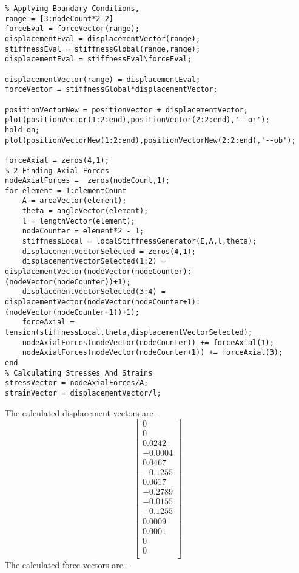 \documentclass{article}
\begin{document}
\begin{verbatim}
% Applying Boundary Conditions,
range = [3:nodeCount*2-2]
forceEval = forceVector(range);
displacementEval = displacementVector(range);
stiffnessEval = stiffnessGlobal(range,range);
displacementEval = stiffnessEval\forceEval;

displacementVector(range) = displacementEval;
forceVector = stiffnessGlobal*displacementVector;

positionVectorNew = positionVector + displacementVector;
plot(positionVector(1:2:end),positionVector(2:2:end),'--or');
hold on;
plot(positionVectorNew(1:2:end),positionVectorNew(2:2:end),'--ob');

forceAxial = zeros(4,1);
% 2 Finding Axial Forces
nodeAxialForces =  zeros(nodeCount,1);
for element = 1:elementCount
    A = areaVector(element);
    theta = angleVector(element);
    l = lengthVector(element);
    nodeCounter = element*2 - 1;
    stiffnessLocal = localStiffnessGenerator(E,A,l,theta);
    displacementVectorSelected = zeros(4,1);
    displacementVectorSelected(1:2) = displacementVector(nodeVector(nodeCounter):(nodeVector(nodeCounter))+1);
    displacementVectorSelected(3:4) = displacementVector(nodeVector(nodeCounter+1):(nodeVector(nodeCounter+1))+1);
    forceAxial = tension(stiffnessLocal,theta,displacementVectorSelected);
    nodeAxialForces(nodeVector(nodeCounter)) += forceAxial(1);
    nodeAxialForces(nodeVector(nodeCounter+1)) += forceAxial(3);
end
% Calculating Stresses And Strains
stressVector = nodeAxialForces/A;
strainVector = displacementVector/l;
\end{verbatim}
The calculated displacement vectors are - 
\[
    \begin{bmatrix}
                0 \\
        0 \\
   0.0242 \\
  -0.0004 \\
   0.0467 \\
  -0.1255 \\
   0.0617 \\
  -0.2789 \\
  -0.0155 \\
  -0.1255 \\
   0.0009 \\
   0.0001 \\
        0 \\
        0 \\
    \end{bmatrix}
\]
The calculated force vectors are - 
\end{document}
